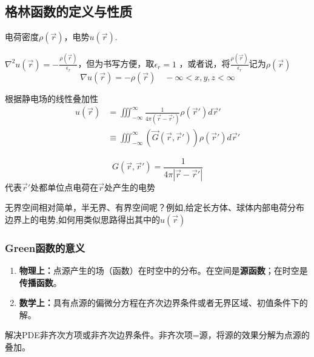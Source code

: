 \subsection{格林函数的定义与性质}
\begin{ex}[三维无界空间静电场]
    电荷密度$\rho(\vec{r})$，电势$u(\vec{r})$.

    $\nabla^{2}u(\vec{r})=-\frac{\rho(\vec{r})}{\epsilon_{r}}$，但为书写方便，取$\epsilon_r=1$
，或者说，将$\frac{\rho(\vec{r})}{\epsilon_{r}}$记为$\rho(\vec{r})$
    $$\nabla u(\vec{r})=-\rho(\vec{r})\quad-\infty<x,y,z<\infty $$

    根据静电场的线性叠加性
    $$\begin{aligned}
        u(\vec{r})
        &=\iiint_{-\infty}^{\infty}\frac{1}{4\pi(\vec{r}-\vec{r}')}\rho(\vec{r}')d\vec{r}'\\
        &\equiv\iiint_{-\infty}^{\infty}(\vec{G}(\vec{r},\vec{r}'))
        \rho(\vec{r}')d\vec{r}'\end{aligned}$$
    
        $$\boxed{G(\vec{r},\vec{r}')=\frac{1}{4\pi|\vec{r}-\vec{r}'|}}$$
    代表$\vec{r}'$处都单位点电荷在$\vec{r}$处产生的电势
\end{ex}

无界空间相对简单，半无界、有界空间呢？例如,给定长方体、球体内部电荷分布边界上的电势,如何用类似思路得出其中的$u(\vec{r})$


\subsubsection*{Green函数的意义}
\begin{enumerate}
    \item \textbf{物理上：}点源产生的场（函数）在时空中的分布。在空间是\textbf{源函数}；在时空是\textbf{传播函数}。
    \item \textbf{数学上：}具有点源的偏微分方程在齐次边界条件或者无界区域、初值条件下的解。
\end{enumerate}
解决PDE非齐次方项或非齐次边界条件。非齐次项=源，将源的效果分解为点源的叠加。

